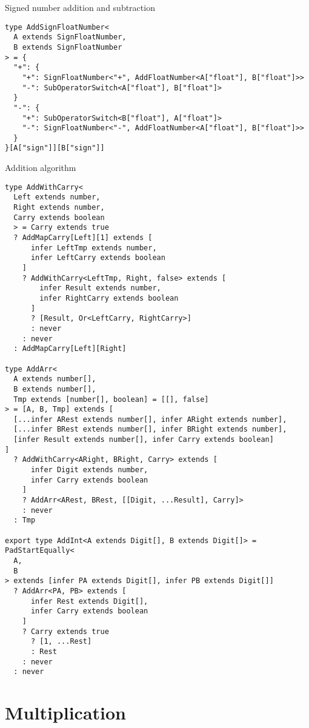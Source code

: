 \begin{listing}[ht]
  \caption{Signed number addition and subtraction}\label{lst:addition-signed}
  \begin{verbatim}
type AddSignFloatNumber<
  A extends SignFloatNumber,
  B extends SignFloatNumber
> = {
  "+": {
    "+": SignFloatNumber<"+", AddFloatNumber<A["float"], B["float"]>>
    "-": SubOperatorSwitch<A["float"], B["float"]>
  }
  "-": {
    "+": SubOperatorSwitch<B["float"], A["float"]>
    "-": SignFloatNumber<"-", AddFloatNumber<A["float"], B["float"]>>
  }
}[A["sign"]][B["sign"]]
\end{verbatim}
\end{listing}


\begin{listing}[ht!]
  \caption{Addition algorithm}\label{lst:addition-algorithm}
  \begin{verbatim}
type AddWithCarry<
  Left extends number,
  Right extends number,
  Carry extends boolean
  > = Carry extends true
  ? AddMapCarry[Left][1] extends [
      infer LeftTmp extends number,
      infer LeftCarry extends boolean
    ]
    ? AddWithCarry<LeftTmp, Right, false> extends [
        infer Result extends number,
        infer RightCarry extends boolean
      ]
      ? [Result, Or<LeftCarry, RightCarry>]
      : never
    : never
  : AddMapCarry[Left][Right]

type AddArr<
  A extends number[],
  B extends number[],
  Tmp extends [number[], boolean] = [[], false]
> = [A, B, Tmp] extends [
  [...infer ARest extends number[], infer ARight extends number],
  [...infer BRest extends number[], infer BRight extends number],
  [infer Result extends number[], infer Carry extends boolean]
]
  ? AddWithCarry<ARight, BRight, Carry> extends [
      infer Digit extends number,
      infer Carry extends boolean
    ]
    ? AddArr<ARest, BRest, [[Digit, ...Result], Carry]>
    : never
  : Tmp

export type AddInt<A extends Digit[], B extends Digit[]> = PadStartEqually<
  A,
  B
> extends [infer PA extends Digit[], infer PB extends Digit[]]
  ? AddArr<PA, PB> extends [
      infer Rest extends Digit[],
      infer Carry extends boolean
    ]
    ? Carry extends true
      ? [1, ...Rest]
      : Rest
    : never
  : never
\end{verbatim}
\end{listing}

\section{Multiplication}

